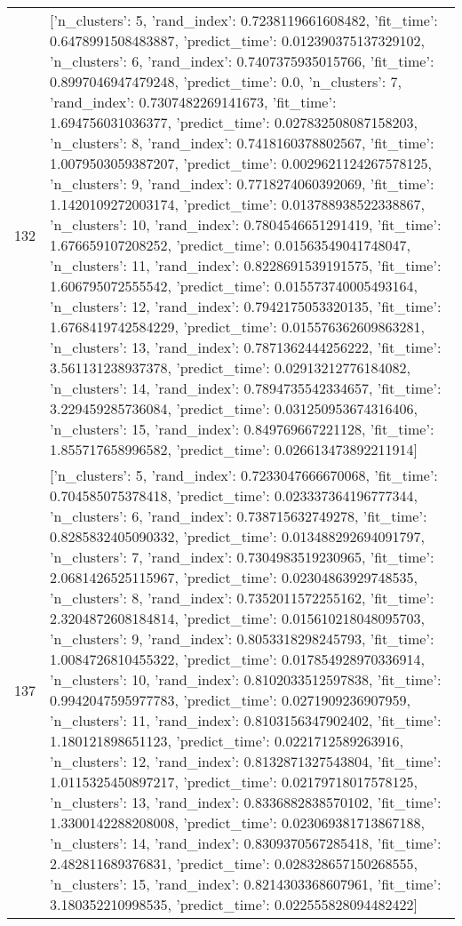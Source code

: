 \begin{tabular}{rl}
132 & [{'n_clusters': 5, 'rand_index': 0.7238119661608482, 'fit_time': 0.6478991508483887, 'predict_time': 0.012390375137329102}, {'n_clusters': 6, 'rand_index': 0.7407375935015766, 'fit_time': 0.8997046947479248, 'predict_time': 0.0}, {'n_clusters': 7, 'rand_index': 0.7307482269141673, 'fit_time': 1.694756031036377, 'predict_time': 0.027832508087158203}, {'n_clusters': 8, 'rand_index': 0.7418160378802567, 'fit_time': 1.0079503059387207, 'predict_time': 0.0029621124267578125}, {'n_clusters': 9, 'rand_index': 0.7718274060392069, 'fit_time': 1.1420109272003174, 'predict_time': 0.013788938522338867}, {'n_clusters': 10, 'rand_index': 0.7804546651291419, 'fit_time': 1.676659107208252, 'predict_time': 0.01563549041748047}, {'n_clusters': 11, 'rand_index': 0.8228691539191575, 'fit_time': 1.606795072555542, 'predict_time': 0.015573740005493164}, {'n_clusters': 12, 'rand_index': 0.7942175053320135, 'fit_time': 1.6768419742584229, 'predict_time': 0.015576362609863281}, {'n_clusters': 13, 'rand_index': 0.7871362444256222, 'fit_time': 3.561131238937378, 'predict_time': 0.02913212776184082}, {'n_clusters': 14, 'rand_index': 0.7894735542334657, 'fit_time': 3.229459285736084, 'predict_time': 0.031250953674316406}, {'n_clusters': 15, 'rand_index': 0.849769667221128, 'fit_time': 1.855717658996582, 'predict_time': 0.026613473892211914}] \\
137 & [{'n_clusters': 5, 'rand_index': 0.7233047666670068, 'fit_time': 0.704585075378418, 'predict_time': 0.023337364196777344}, {'n_clusters': 6, 'rand_index': 0.738715632749278, 'fit_time': 0.8285832405090332, 'predict_time': 0.013488292694091797}, {'n_clusters': 7, 'rand_index': 0.7304983519230965, 'fit_time': 2.0681426525115967, 'predict_time': 0.02304863929748535}, {'n_clusters': 8, 'rand_index': 0.7352011572255162, 'fit_time': 2.3204872608184814, 'predict_time': 0.015610218048095703}, {'n_clusters': 9, 'rand_index': 0.8053318298245793, 'fit_time': 1.0084726810455322, 'predict_time': 0.017854928970336914}, {'n_clusters': 10, 'rand_index': 0.8102033512597838, 'fit_time': 0.9942047595977783, 'predict_time': 0.0271909236907959}, {'n_clusters': 11, 'rand_index': 0.8103156347902402, 'fit_time': 1.180121898651123, 'predict_time': 0.0221712589263916}, {'n_clusters': 12, 'rand_index': 0.8132871327543804, 'fit_time': 1.0115325450897217, 'predict_time': 0.02179718017578125}, {'n_clusters': 13, 'rand_index': 0.8336882838570102, 'fit_time': 1.3300142288208008, 'predict_time': 0.023069381713867188}, {'n_clusters': 14, 'rand_index': 0.8309370567285418, 'fit_time': 2.482811689376831, 'predict_time': 0.028328657150268555}, {'n_clusters': 15, 'rand_index': 0.8214303368607961, 'fit_time': 3.180352210998535, 'predict_time': 0.022555828094482422}] \\

\end{tabular}
